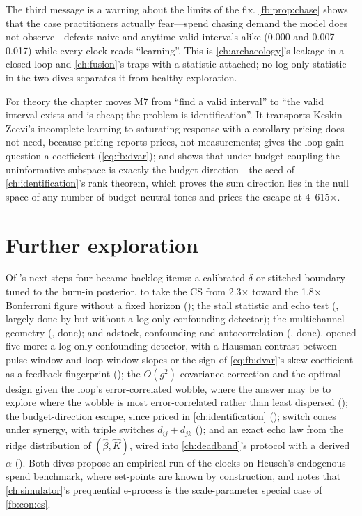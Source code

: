 The third message is a warning about the limits of the fix. \cref{fb:prop:chase} shows that the case practitioners actually fear---spend chasing demand the model does not observe---defeats naive and anytime-valid intervals alike (0.000 and 0.007--0.017) while every clock reads ``learning''. This is \cref{ch:archaeology}'s leakage in a closed loop and \cref{ch:fusion}'s traps with a statistic attached; no log-only statistic in the two dives separates it from healthy exploration.

For theory the chapter moves M7 from ``find a valid interval'' to ``the valid interval exists and is cheap; the problem is identification''. It transports Keskin--Zeevi's incomplete learning to saturating response with a corollary pricing does not need, because pricing reports prices, not measurements; gives the loop-gain question a coefficient (\cref{eq:fb:dvar}); and shows that under budget coupling the uninformative subspace is exactly the budget direction---the seed of \cref{ch:identification}'s rank theorem, which proves the sum direction lies in the null space of any number of budget-neutral tones and prices the escape at 4--615$\times$.

\section{Further exploration}

Of 's next steps four became backlog items: a calibrated-$\delta$ or stitched boundary tuned to the burn-in posterior, to take the CS from 2.3$\times$ toward the 1.8$\times$ Bonferroni figure without a fixed horizon (); the stall statistic and echo test (, largely done by  but without a log-only confounding detector); the multichannel geometry (, done); and adstock, confounding and autocorrelation (, done).  opened five more: a log-only confounding detector, with a Hausman contrast between pulse-window and loop-window slopes or the sign of \cref{eq:fb:dvar}'s skew coefficient as a feedback fingerprint (); the $O(g^2)$ covariance correction and the optimal design given the loop's error-correlated wobble, where the answer may be to explore where the wobble is most error-correlated rather than least dispersed (); the budget-direction escape, since priced in \cref{ch:identification} (); switch cones under synergy, with triple switches $d_{ij} + d_{jk}$ (); and an exact echo law from the ridge distribution of $(\hat\beta, \hat K)$, wired into \cref{ch:deadband}'s protocol with a derived $\alpha$ (). Both dives propose an empirical run of the clocks on Heusch's endogenous-spend benchmark, where set-points are known by construction, and  notes that \cref{ch:simulator}'s prequential e-process is the scale-parameter special case of \cref{fb:con:cs}.

